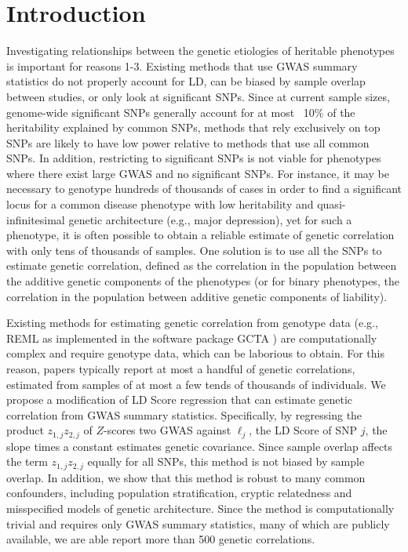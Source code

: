 \documentclass[11pt]{article}
\begin{document}
\section{Introduction}
\label{Introduction}

Investigating relationships between the genetic etiologies of heritable phenotypes is important for reasons 1-3.
Existing methods that use GWAS summary statistics do not properly account for LD, can be biased by sample overlap between studies, or only look at significant SNPs.
Since at current sample sizes, genome-wide significant SNPs generally account for at most ~10\% of the heritability explained by common SNPs, methods that rely exclusively on top SNPs are likely to have low power relative to methods that use all common SNPs. 
In addition, restricting to significant SNPs is not viable for phenotypes where there exist large GWAS and no significant SNPs. 
For instance, it may be necessary to genotype hundreds of thousands of cases in order to find a significant locus for a common disease phenotype with low heritability and quasi-infinitesimal genetic architecture (e.g., major depression), yet for such a phenotype, it is often possible to obtain a reliable estimate of genetic correlation with only tens of thousands of samples.
One solution is to use all the SNPs to estimate genetic correlation, defined as the correlation in the population between the additive genetic components of the phenotypes (or for binary phenotypes, the correlation in the population between additive genetic components of liability).

Existing methods for estimating genetic correlation from genotype data (e.g., REML as implemented in the software package GCTA \cite{yang2010, yang2011gcta}) are computationally complex 
and require genotype data, which can be laborious to obtain. 
For this reason, papers typically report at most a handful of genetic correlations, estimated from samples of at most a few tends of thousands of individuals.
We propose a modification of LD Score regression \cite{buliksullivan2014} that can estimate genetic correlation from GWAS summary statistics. 
Specifically, by regressing the product $z_{1,j}z_{2,j}$ of $Z$-scores two GWAS against $\ell_j$, the LD Score of SNP $j$, the slope times a constant estimates genetic covariance.
Since sample overlap affects the term $z_{1,j}z_{2,j}$ equally for all SNPs, this method is not biased by sample overlap.
In addition, we show that this method is robust to many common confounders, including population stratification, cryptic relatedness and misspecified models of genetic architecture.
Since the method is computationally trivial and requires only GWAS summary statistics, many of which are publicly available, we are able report more than 500 genetic correlations.
\end{document}
